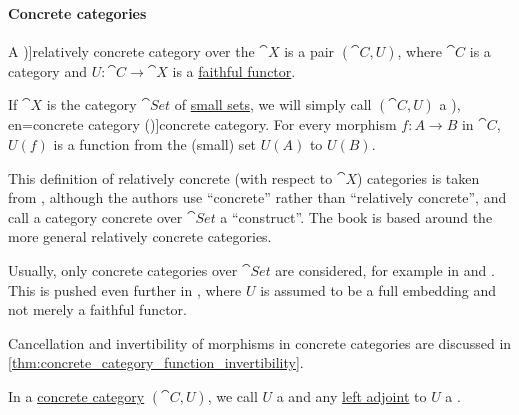 \paragraph{Concrete categories}

\begin{definition}\label{def:concrete_category}
  A \term[en=concrete category (\cite[def. 5.1]{AdámekHerrlichStrecker1990JoyOfCats})]{relatively concrete category} over the  \( \cat{X} \) is a pair \( (\cat{C}, U) \), where \( \cat{C} \) is a category and \( U: \cat{C} \to \cat{X} \) is a \hyperref[def:functor_invertibility/faithful]{faithful functor}.

  If \( \cat{X} \) is the category \hyperref[def:category_of_small_sets]{\( \cat{Set} \)} of \hyperref[def:small_set]{small sets}, we will simply call \( (\cat{C}, U) \) a \term[ru=конкретная категория (\cite[228]{ЦаленкоШульгейфер1974ОсновыТеорииКатегорий}), en=concrete category (\cite[26]{MacLane1998CategoryTheory})]{concrete category}. For every morphism \( f: A \to B \) in \( \cat{C} \), \( U(f) \) is a function from the (small) set \( U(A) \) to \( U(B) \).
\end{definition}
\begin{comments}
  \item This definition of relatively concrete (with respect to \( \cat{X} \)) categories is taken from \cite[def. 5.1]{AdámekHerrlichStrecker1990JoyOfCats}, although the authors use \enquote{concrete} rather than \enquote{relatively concrete}, and call a category concrete over \( \cat{Set} \) a \enquote{construct}. The book is based around the more general relatively concrete categories.

  Usually, only concrete categories over \( \cat{Set} \) are considered, for example in \cite[26]{MacLane1998CategoryTheory} and \cite[def. 1.6.17]{Riehl2016CategoryTheory}. This is pushed even further in \cite[228]{ЦаленкоШульгейфер1974ОсновыТеорииКатегорий}, where \( U \) is assumed to be a full embedding and not merely a faithful functor.

  \item Cancellation and invertibility of morphisms in concrete categories are discussed in \cref{thm:concrete_category_function_invertibility}.
\end{comments}

\begin{concept}\label{con:forgetful_functor}
  In a \hyperref[def:concrete_category]{concrete category} \( (\cat{C}, U) \), we call \( U \) a  and any \hyperref[def:category_adjunction]{left adjoint} to \( U \) a .
\end{concept}

